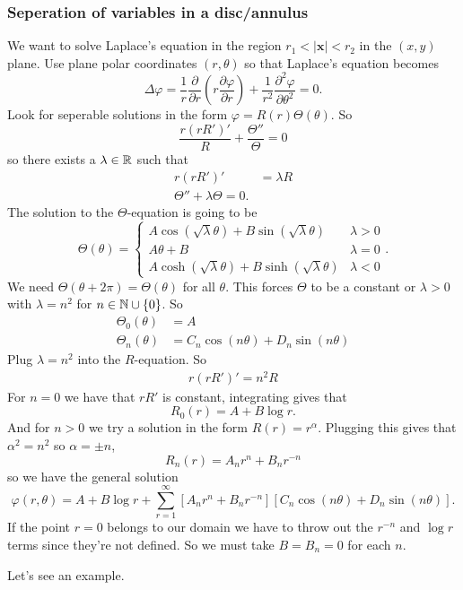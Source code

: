 \documentclass{article}
\begin{document}
\subsubsection{Seperation of variables in a disc/annulus}
We want to solve Laplace's equation in the region $ r_1<|\mathbf x|<r_2 $ in the $ (x,y) $ plane. Use plane polar coordinates $ (r,\theta) $ so that Laplace's equation becomes
\[
	\Delta\varphi=\frac 1r\frac{\partial}{\partial r}\left(r\frac{\partial\varphi}{\partial r}\right)+\frac1{r^2}\frac{\partial ^2 \varphi}{\partial \theta^2}=0.
\]
Look for seperable solutions in the form $ \varphi=R(r)\Theta(\theta) $. So
\[
	\frac{r(rR')'}R+\frac{\Theta''}\Theta=0
\]
so there exists a $ \lambda\in \mathbb{R} $ such that
\begin{align*}
	r(rR')' &= \lambda R\\
	\Theta'' + \lambda \Theta = 0.
\end{align*}
The solution to the $ \Theta $-equation is going to be
\[
  \Theta(\theta)=\begin{cases}
	  A\cos(\sqrt\lambda\theta) + B\sin(\sqrt\lambda\theta) & \lambda >0 \\
	  A\theta +B & \lambda =0 \\
	  A\cosh(\sqrt\lambda\theta) + B\sinh(\sqrt\lambda\theta) & \lambda <0
  \end{cases}.
\]
We need $ \Theta(\theta+2\pi)=\Theta(\theta) $ for all $ \theta $. This forces $ \Theta $ to be a constant or $ \lambda>0 $ with $ \lambda = n^2 $ for $ n\in \mathbb{N} \cup \{0\} $. So
\begin{align*}
	\Theta_0(\theta)&=A\\
	\Theta_n(\theta)&=C_n\cos(n\theta)+D_n\sin(n\theta)
\end{align*}
Plug $ \lambda=n^2 $ into the $ R $-equation. So
\begin{align*}
  r(rR')'=n^2R
\end{align*}
For $ n=0 $ we have that $ rR' $ is constant, integrating gives that
\[
  R_0(r)=A+B\log r.
\]
And for $ n>0 $ we try a solution in the form $ R(r)=r^\alpha $. Plugging this gives that $ \alpha^2=n^2 $ so $ \alpha=\pm n $,
\[
	R_n(r)=A_nr^n+B_nr^{-n}
\]
so we have the general solution
\[
	\varphi(r,\theta)=A+B\log r+\sum_{r=1}^\infty\left[A_nr^n+B_nr^{-n}\right]\left[C_n\cos(n\theta)+D_n\sin(n\theta)\right].
\]
If the point $ r=0 $ belongs to our domain we have to throw out the $ r^{-n} $ and $ \log r $ terms since they're not defined. So we must take $ B=B_n=0 $ for each $ n $.\par
Let's see an example.\\
\end{document}
